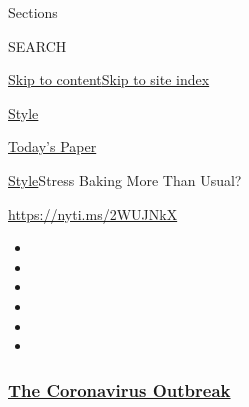Sections

SEARCH

\protect\hyperlink{site-content}{Skip to
content}\protect\hyperlink{site-index}{Skip to site index}

\href{https://www.nytimes3xbfgragh.onion/section/style}{Style}

\href{https://myaccount.nytimes3xbfgragh.onion/auth/login?response_type=cookie\&client_id=vi}{}

\href{https://www.nytimes3xbfgragh.onion/section/todayspaper}{Today's
Paper}

\href{/section/style}{Style}\textbar{}Stress Baking More Than Usual?

\url{https://nyti.ms/2WUJNkX}

\begin{itemize}
\item
\item
\item
\item
\item
\item
\end{itemize}

\hypertarget{the-coronavirus-outbreak}{%
\subsubsection{\texorpdfstring{\href{https://www.nytimes3xbfgragh.onion/news-event/coronavirus?name=styln-coronavirus-national\&region=TOP_BANNER\&block=storyline_menu_recirc\&action=click\&pgtype=Article\&impression_id=808c19c0-f267-11ea-aa98-cfc271ad1787\&variant=undefined}{The
Coronavirus
Outbreak}}{The Coronavirus Outbreak}}\label{the-coronavirus-outbreak}}

